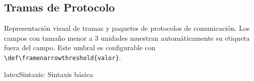 \begin{fsmdiagram}
\end{fsmdiagram}

\subsection{Tramas de Protocolo}
\label{subsec:tramas}

Representación visual de tramas y paquetes de protocolos de comunicación.
Los campos con tamaño menor a 3 unidades muestran automáticamente su etiqueta
fuera del campo. Este umbral es configurable con \verb|\def\framenarrowthreshold{valor}|.


\begin{codigosimple}{latex}{Sintaxis: Sintaxis básica}
\begin{protocolframe}
  \framebreak                       %
\end{protocolframe}
\end{codigosimple}


\begin{protocolframe}[32]
  \framebreak
\end{protocolframe}

\vspace{1em}


\begin{protocolframe}[16]
  \framebreak
\end{protocolframe}

\vspace{1em}

